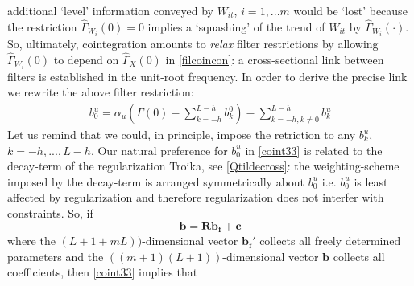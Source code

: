 \documentclass[11pt]{article}
\begin{document}
additional `level' information conveyed by $W_{it}$, $i=1,...m$ would be `lost' because  the restriction $\hat{\Gamma}_{W_i}(0)=0$ implies a `squashing' of the trend of $W_{it}$ by $\hat{\Gamma}_{W_i}(\cdot)$. So, ultimately, cointegration amounts to \emph{relax} filter restrictions by allowing 
$\hat{\Gamma}_{W_i}(0)$ to depend on $\hat{\Gamma}_X(0)$ in \ref{filcoincon}: a cross-sectional link between filters is established in the unit-root frequency. In order to derive the precise link we rewrite the above filter restriction:
\begin{eqnarray}\label{coint33}
b_0^u=\alpha_u \left(\Gamma(0)-\sum_{k=-h}^{L-h}b_k^0\right)-\sum_{k=-h,k\not=0}^{L-h}b_k^u
\end{eqnarray}
Let us remind that we could, in principle, impose the retriction to any $b_k^u$, $k=-h,...,L-h$. Our natural preference for $b_0^u$ in \ref{coint33} is related to the decay-term of the regularization Troika, see \ref{Qtildecross}: the weighting-scheme imposed by the decay-term is arranged symmetrically about $b_0^u$ i.e. $b_0^u$ is least affected by regularization and therefore regularization  does not interfer with constraints. So, if
\[\mathbf{b=Rb_f+c}\]
where the $(L+1+mL))$-dimensional vector $\mathbf{b_f'}$ collects all freely determined parameters and the $((m+1)(L+1))$-dimensional vector $\mathbf{b}$ collects all coefficients, 
then \ref{coint33} implies that
\end{document}
